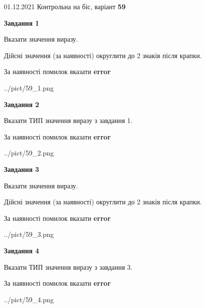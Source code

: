 \documentclass[11pt, ukrainian]{article}
\begin{document}
{01.12.2021 Контрольна на біс, варіант  \No \textbf { 59 }\par}
{
\begin {large}
{\begin {center}\textbf{Завдання 1}\end {center}}\par
Вказати значення виразу. \par
Дійсні значення (за наявності) округлити до 2 знаків після крапки. \par
За наявності помилок вказати \textbf{error}

\begin{center}
	{../pict/59_1.png}
\end{center}
\newpage

{\begin {center}\textbf{Завдання 2}\end {center}}\par
Вказати ТИП значення виразу з завдання 1. \par
За наявності помилок вказати \textbf{error}

\begin{center}
	{../pict/59_2.png}
\end{center}
\newpage

{\begin {center}\textbf{Завдання 3}\end {center}}\par
Вказати значення виразу. \par
Дійсні значення (за наявності) округлити до 2 знаків після крапки. \par
За наявності помилок вказати \textbf{error}

\begin{center}
	{../pict/59_3.png}
\end{center}
\newpage

{\begin {center}\textbf{Завдання 4}\end {center}}\par
Вказати ТИП значення виразу з завдання 3. \par
За наявності помилок вказати \textbf{error}

\begin{center}
	{../pict/59_4.png}
\end{center}
\newpage


\end{large}}
\end{document}
